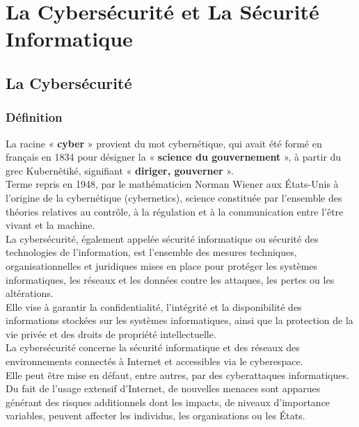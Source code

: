 \chapter{La Cybersécurité et La Sécurité Informatique}
\section{La Cybersécurité}
\subsection{Définition}

La racine « \textbf{cyber} » provient du mot cybernétique, qui avait été formé en français
en 1834 pour désigner la «\textbf{ science du gouvernement} », à partir du grec Kubernêtiké, signifiant « \textbf{diriger, gouverner} ».\\
Terme repris en 1948, par le mathématicien Norman Wiener aux États-Unis à l’origine de la cybernétique (cybernetics), science constituée par l’ensemble des théories relatives au contrôle, à la régulation et à la communication entre l’être vivant et la machine.\\
La cybersécurité, également appelée sécurité informatique ou sécurité des technologies de l'information, est l'ensemble des mesures techniques, organisationnelles et juridiques mises en place pour protéger les systèmes informatiques, les réseaux et les données contre les attaques, les pertes ou les altérations.\\
 Elle vise à garantir la confidentialité, l'intégrité et la disponibilité des informations stockées sur les systèmes informatiques, ainsi que la protection de la vie privée et des droits de propriété intellectuelle.\\

La cybersécurité concerne la sécurité informatique et des réseaux des environnements connectés à Internet et accessibles via le cyberespace.\\
 Elle peut être mise en défaut, entre autres, par des cyberattaques informatiques.\\
 Du fait de l’usage extensif d’Internet, de nouvelles menaces sont apparues générant des risques additionnels dont les impacts, de niveaux d’importance variables, peuvent affecter les individus, les organisations ou les États.\\ 

